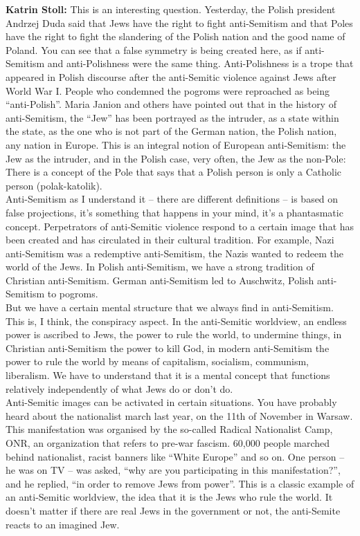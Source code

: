 \textbf{Katrin Stoll:} This is an interesting question. Yesterday, the Polish president Andrzej Duda said that Jews have the right to fight anti-Semitism and that Poles have the right to fight the slandering of the Polish nation and the good name of Poland. You can see that a false symmetry is being created here, as if anti-Semitism and anti-Polishness were the same thing. Anti-Polishness is a trope that appeared in Polish discourse after the anti-Semitic violence against Jews after World War I. People who condemned the pogroms were reproached as being ``anti-Polish''. Maria Janion and others have pointed out that in the history of anti-Semitism, the ``Jew'' has been portrayed as the intruder, as a state within the state, as the one who is not part of the German nation, the Polish nation, any nation in Europe. This is an integral notion of European anti-Semitism: the Jew as the intruder, and in the Polish case, very often, the Jew as the non-Pole: There is a concept of the Pole that says that a Polish person is only a Catholic person (polak-katolik).\\ 
Anti-Semitism as I understand it – there are different definitions – is based on false projections, it’s something that happens in your mind, it’s a phantasmatic concept. Perpetrators of anti-Semitic violence respond to a certain image that has been created and has circulated in their cultural tradition. For example, Nazi anti-Semitism was a redemptive anti-Semitism, the Nazis wanted to redeem the world of the Jews. In Polish anti-Semitism, we have a strong tradition of Christian anti-Semitism. German anti-Semitism led to Auschwitz, Polish anti-Semitism to pogroms.\\ 
But we have a certain mental structure that we always find in anti-Semitism. This is, I think, the conspiracy aspect. In the anti-Semitic worldview, an endless power is ascribed to Jews, the power to rule the world, to undermine things, in Christian anti-Semitism the power to kill God, in modern anti-Semitism the power to rule the world by means of capitalism, socialism, communism, liberalism. We have to understand that it is a mental concept that functions relatively independently of what Jews do or don’t do.\\
Anti-Semitic images can be activated in certain situations. You have probably heard about the nationalist march last year, on the 11th of November in Warsaw. This manifestation was organised by the so-called Radical Nationalist Camp, ONR, an organization that refers to pre-war fascism. 60,000 people marched behind nationalist, racist banners like ``White Europe'' and so on. One person – he was on TV – was asked, ``why are you participating in this manifestation?'', and he replied, ``in order to remove Jews from power''. This is a classic example of an anti-Semitic worldview, the idea that it is the Jews who rule the world. It doesn’t matter if there are real Jews in the government or not, the anti-Semite reacts to an imagined Jew.\\
